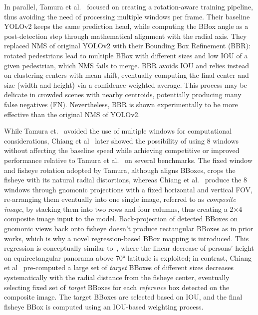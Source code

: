 \documentclass[twocolumn]{svjour3}          %
\begin{document}
In parallel, Tamura et al.~\cite{masato_wacv2019} focused on creating a rotation-aware training pipeline, thus avoiding the need of processing multiple windows per frame. Their baseline YOLOv2 keeps the same prediction head, while computing the BBox angle as a post-detection step through mathematical alignment with the radial axis. They replaced NMS of original YOLOv2 with their Bounding Box Refinement (BBR): rotated pedestrians lead to multiple BBox with different sizes and low IOU of a given pedestrian, which NMS fails to merge. BBR avoids IOU and relies instead on clustering centers with mean-shift, eventually computing the final center and size (width and height) via a confidence-weighted average. This process may be delicate in crowded scenes with nearby centroids, potentially producing many false negatives (FN). Nevertheless, BBR is shown experimentally to be more effective than the original NMS of YOLOv2. 

While Tamura et.~\cite{masato_wacv2019} avoided the use of multiple windows for computational considerations, Chiang et al~\cite{chiang2021efficient} later showed the possibility of using 8 windows without affecting the baseline speed while achieving competitive or improved performance relative to Tamura et al.~\cite{masato_wacv2019} on several benchmarks. The fixed window and fisheye rotation adopted by Tamura, although aligns BBoxes, crops the fisheye with its natural radial distortions, whereas Chiang et al.~\cite{chiang2021efficient} produce the 8 windows through gnomonic projections with a fixed horizontal and vertical FOV, re-arranging them eventually into one single image, referred to as \textit{composite image}, by stacking them into two rows and four columns, thus creating a 2×4 composite image input to the model. Back-projection of detected BBoxes on gnomonic views back onto fisheye doesn't produce rectangular BBoxes as in prior works, which is why a novel regression-based BBox mapping is introduced. This regression is conceptually similar to~\cite{wakai2025panoramic}, where the linear decrease of persons' height on equirectangular panorama above 70° latitude is exploited; in contrast, Chiang et al~\cite{chiang2021efficient} pre-computed a large set of \textit{target} BBoxes of different sizes decreases systematically with the radial distance from the fisheye center, eventually selecting fixed set of \textit{target} BBoxes for each \textit{reference} box detected on the composite image. The target BBoxes are selected based on IOU, and the final fisheye BBox is computed using an IOU-based weighting process.
\end{document}
